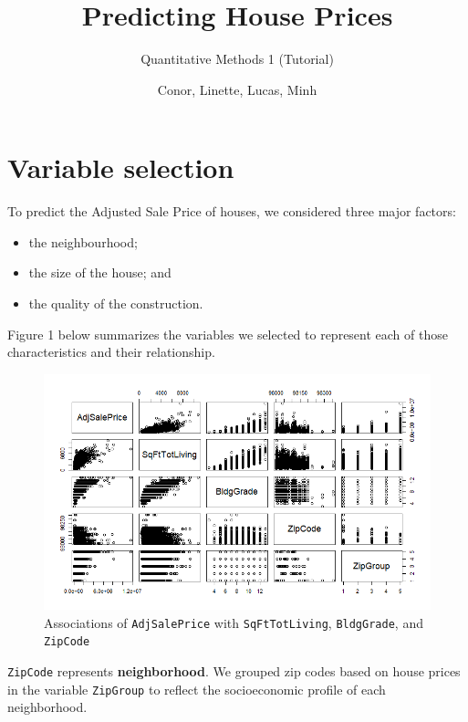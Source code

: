 \documentclass[12pt,a4paper]{article}
\title{Predicting House Prices}
\date{Conor, Linette, Lucas, Minh}
\author{Quantitative Methods 1 (Tutorial)}
\begin{document}
\maketitle

\section{Variable selection}

	\noindent To predict the Adjusted Sale Price of houses, we considered three major factors:
	
	\begin{itemize}
		\item the neighbourhood;
		\item the size of the house; and
		\item the quality of the construction. \\
	\end{itemize}
	
	\noindent Figure 1 below summarizes the variables we selected to represent each of those characteristics and their relationship.
	
		 	
	
	\begin{figure}[H]
		\centering
		\includegraphics[width=1\linewidth]{AdjSalePrice_pairs}
		\caption{Associations of \texttt{AdjSalePrice} with \texttt{SqFtTotLiving}, \texttt{BldgGrade}, and \texttt{ZipCode}}
		\label{fig:adjsalepricepairs}
	\end{figure}
		
	\noindent \texttt{ZipCode} represents \textbf{neighborhood}. We grouped zip codes based on house prices in the variable \texttt{ZipGroup} to reflect the socioeconomic profile of each neighborhood. \\
	
\end{document}
